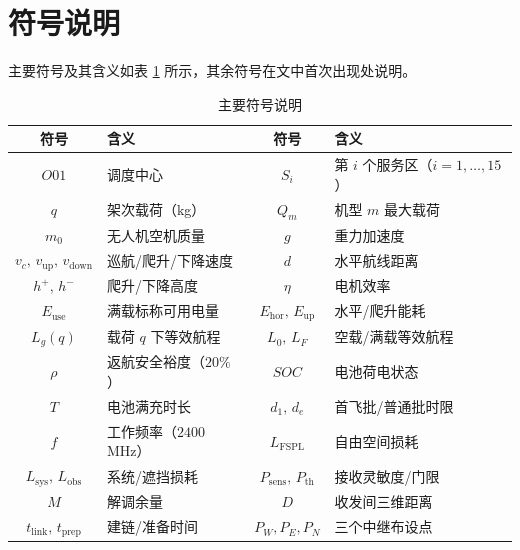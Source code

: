 \section{符号说明}
\label{sec:symbol}

主要符号及其含义如表 \ref{tab:symbols} 所示，其余符号在文中首次出现处说明。

\begin{table}[htbp]
\centering
\caption{主要符号说明}
\label{tab:symbols}
\begin{tabular}{clcl}
\toprule
符号 & 含义 & 符号 & 含义 \\
\midrule
$O01$ & 调度中心 & $S_i$ & 第 $i$ 个服务区（$i=1,\dots,15$）\\
$q$ & 架次载荷（kg） & $Q_m$ & 机型 $m$ 最大载荷 \\
$m_0$ & 无人机空机质量 & $g$ & 重力加速度 \\
$v_c,\,v_{\mathrm{up}},\,v_{\mathrm{down}}$ & 巡航/爬升/下降速度 & $d$ & 水平航线距离 \\
$h^+,\,h^-$ & 爬升/下降高度 & $\eta$ & 电机效率 \\
$E_{\mathrm{use}}$ & 满载标称可用电量 & $E_{\mathrm{hor}},\,E_{\mathrm{up}}$ & 水平/爬升能耗 \\
$L_g(q)$ & 载荷 $q$ 下等效航程 & $L_0,\,L_F$ & 空载/满载等效航程 \\
$\rho$ & 返航安全裕度（$20\%$） & $SOC$ & 电池荷电状态 \\
$T$ & 电池满充时长 & $d_1,\,d_e$ & 首飞批/普通批时限 \\
$f$ & 工作频率（$2400$\,MHz） & $L_{\mathrm{FSPL}}$ & 自由空间损耗 \\
$L_{\mathrm{sys}},\,L_{\mathrm{obs}}$ & 系统/遮挡损耗 & $P_{\mathrm{sens}},\,P_{\mathrm{th}}$ & 接收灵敏度/门限 \\
$M$ & 解调余量 & $D$ & 收发间三维距离 \\
$t_{\mathrm{link}},\,t_{\mathrm{prep}}$ & 建链/准备时间 & $P_W,P_E,P_N$ & 三个中继布设点 \\
\bottomrule
\end{tabular}
\end{table}